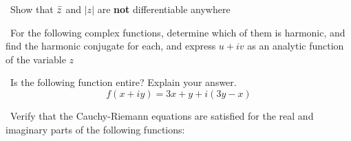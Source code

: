 \documentclass[12pt]{exam}
\begin{document}
\begin{questions}

\vspace{1em}

\question\ Show that \(\Bar{z}\) and \(|z|\) are \textbf{not} differentiable anywhere

\vspace{1em}

\question\ For the following complex functions, determine which of them is harmonic, and find the harmonic conjugate for each, and express \(u + iv\) as an analytic function of the variable \(z\)



\question\ Is the following function entire? Explain your answer.
\[f(x+iy) = 3x + y +i(3y - x)\]


\question\ Verify that the Cauchy-Riemann equations are satisfied for the real and imaginary parts of the following functions:


\end{questions}
\end{document}
